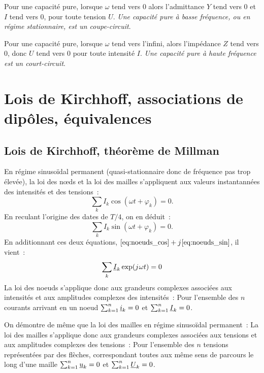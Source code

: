         Pour une capacité pure, lorsque $\omega$ tend vers 0 alors l'admittance $Y$ tend vers 0 et $I$ tend vers 0, pour toute tension $U$. \emph{Une capacité pure à basse fréquence, ou en régime stationnaire, est un coupe-circuit}.

        Pour une capacité pure, lorsque $\omega$ tend vers l'infini, alors l'impédance $Z$ tend vers 0, donc $U$ tend vers 0 pour toute intensité $I$. \emph{Une capacité pure à haute fréquence est un court-circuit}.
\section{Lois de Kirchhoff, associations de dipôles, équivalences}
    \subsection{Lois de Kirchhoff, théorème de Millman}
        En régime sinusoïdal permanent (quasi-stationnaire donc de fréquence pas trop élevée), la loi des n\oe{}ds et la loi des mailles s'appliquent aux valeurs instantannées des intensités et des tensions~:
        \begin{equation}
            \label{eq:noeuds_cos}
            \sum_{k} I_k\cos(\omega t +\varphi_k) = 0.
        \end{equation}
        En reculant l'origine des dates de $T/4$, on en déduit~:
        \begin{equation}
            \label{eq:noeuds_sin}
            \sum_{k} I_k\sin(\omega t +\varphi_k) = 0.
        \end{equation}
        En additionnant ces deux équations, $\eqref{eq:noeuds_cos} + {j\mkern1mu} \eqref{eq:noeuds_sin}$, il vient~:
        \begin{equation}
            \label{eq:noeuds_cplx}
            \sum_k \underline{I}_k \exp({j\mkern1mu}\omega t) = 0
        \end{equation}
        La loi des noeuds s'applique donc aux grandeurs complexes associées aux intensités et aux amplitudes complexes des intensités~: Pour l'ensemble des $n$ courants arrivant en un noeud $\sum_{k=1}^n \underline{i}_k = 0$ et $\sum_{k=1}^n \underline{I}_k = 0$.

        On démontre de même que la loi des mailles en régime sinusoïdal permanent~: La loi des mailles s'applique donc aux grandeurs complexes associées aux tensions et aux amplitudes complexes des tensions~: Pour l'ensemble des $n$ tensions représentées par des flèches, correspondant toutes aux même sens de parcours le long d'une maille $\sum_{k=1}^n \underline{u}_k = 0$ et $\sum_{k=1}^n \underline{U}_k = 0$.

